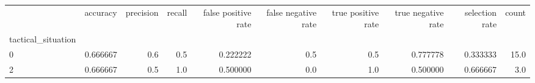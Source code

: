 \begin{tabular}{lrrrrrrrrr}
\toprule
{} &  accuracy &  precision &  recall &  false positive rate &  false negative rate &  true positive rate &  true negative rate &  selection rate &  count \\
tactical\_situation &           &            &         &                      &                      &                     &                     &                 &        \\
\midrule
0                  &  0.666667 &        0.6 &     0.5 &             0.222222 &                  0.5 &                 0.5 &            0.777778 &        0.333333 &   15.0 \\
2                  &  0.666667 &        0.5 &     1.0 &             0.500000 &                  0.0 &                 1.0 &            0.500000 &        0.666667 &    3.0 \\
\bottomrule
\end{tabular}
